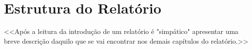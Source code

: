 \documentclass[a4paper,12pt]{scrreprt}
\begin{document}
    \section{Estrutura do Relatório}
        <<Após a leitura da introdução de um relatório é "simpático" apresentar uma breve descrição daquilo que se vai encontrar nos demais capítulos do relatório.>>



%
%
%
%
%
\end{document}
